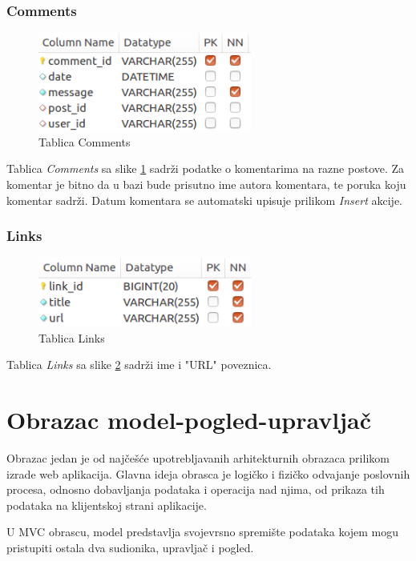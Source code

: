 \documentclass[zavrsni, numeric]{fer}
\begin{document}
\subsubsection{Comments}

\begin{figure}[H]
	\centering
	\includegraphics[width=7cm]{slike/t-comments.png}
	\caption{Tablica Comments}
	\label{fig:t-comments}
\end{figure}

Tablica \textit{Comments} sa slike \ref{fig:t-comments} sadrži podatke o komentarima na razne postove. Za komentar je bitno da u bazi bude prisutno ime autora komentara, te poruka koju komentar sadrži. Datum komentara se automatski upisuje prilikom \textit{Insert} akcije.

\subsubsection{Links}

\begin{figure}[H]
	\centering
	\includegraphics[width=7cm]{slike/t-links.png}
	\caption{Tablica Links}
	\label{fig:t-links}
\end{figure}

Tablica \textit{Links} sa slike \ref{fig:t-links} sadrži ime i "URL" poveznica.

\section{Obrazac model-pogled-upravljač}
Obrazac jedan je od najčešće upotrebljavanih arhitekturnih obrazaca prilikom izrade web aplikacija. Glavna ideja obrasca je logičko i fizičko odvajanje poslovnih procesa, odnosno dobavljanja podataka i operacija nad njima, od prikaza tih podataka na klijentskoj strani aplikacije.  

U MVC obrascu, model predstavlja svojevrsno spremište podataka kojem mogu pristupiti ostala dva sudionika, upravljač i pogled. 
\end{document}
